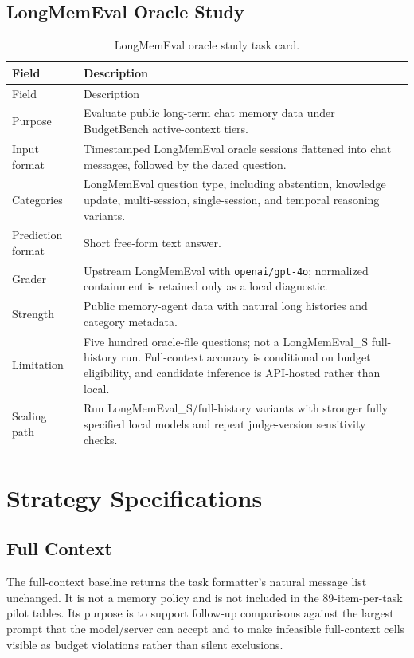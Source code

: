 \documentclass[11pt]{article}
\begin{document}
\subsection{LongMemEval Oracle Study}

\begin{longtable}{L{0.24\textwidth}L{0.66\textwidth}}
\caption{LongMemEval oracle study task card.}\label{tab:task_longmemeval_card}\\
\toprule
Field & Description \\
\midrule
\endfirsthead
\toprule
Field & Description \\
\midrule
\endhead
Purpose & Evaluate public long-term chat memory data under BudgetBench active-context tiers. \\
Input format & Timestamped LongMemEval oracle sessions flattened into chat messages, followed by the dated question. \\
Categories & LongMemEval question type, including abstention, knowledge update, multi-session, single-session, and temporal reasoning variants. \\
Prediction format & Short free-form text answer. \\
Grader & Upstream LongMemEval  with \texttt{openai/gpt-4o}; normalized containment is retained only as a local diagnostic. \\
Strength & Public memory-agent data with natural long histories and category metadata. \\
Limitation & Five hundred oracle-file questions; not a LongMemEval\_S full-history run.  Full-context accuracy is conditional on budget eligibility, and candidate inference is API-hosted rather than local. \\
Scaling path & Run LongMemEval\_S/full-history variants with stronger fully specified local models and repeat judge-version sensitivity checks. \\
\bottomrule
\end{longtable}

\section{Strategy Specifications}

\subsection{Full Context}

The full-context baseline returns the task formatter's natural message list
unchanged.  It is not a memory policy and is not included in the 89-item-per-task pilot
tables.  Its purpose is to support follow-up comparisons against the largest
prompt that the model/server can accept and to make infeasible full-context
cells visible as budget violations rather than silent exclusions.
\end{document}

